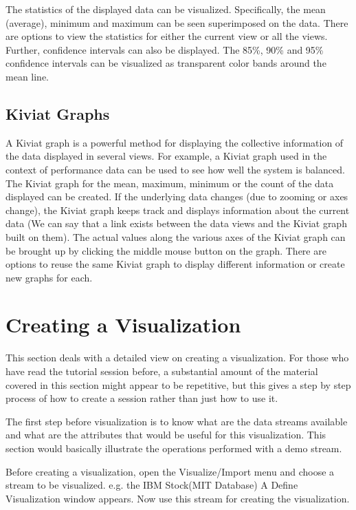 The statistics of the displayed data can be visualized. Specifically,
the mean (average), minimum and maximum can be seen superimposed on
the data.  There are options to view the statistics for either the
current view or all the views.  Further, confidence intervals can also
be displayed.  The 85\%, 90\% and 95\% confidence intervals can be
visualized as transparent color bands around the mean line.

\subsection{Kiviat Graphs}

A Kiviat graph is a powerful method for displaying the collective
information of the data displayed in several views. For example, a
Kiviat graph used in the context of performance data can be used to
see how well the system is balanced. The Kiviat graph for the mean,
maximum, minimum or the count of the data displayed can be created. If
the underlying data changes (due to zooming or axes change), the
Kiviat graph keeps track and displays information about the current
data (We can say that a link exists between the data views and the
Kiviat graph built on them). The actual values along the various axes
of the Kiviat graph can be brought up by clicking the middle mouse
button on the graph. There are options to reuse the same Kiviat graph
to display different information or create new graphs for each.

\section{Creating a Visualization}

This section deals with a detailed view on creating a visualization. For those who have read the tutorial session before, a substantial amount of the  material covered in this section might appear to be repetitive, but this gives a step by step process of how to create a session rather than just how to use it.

The first step before visualization is to know what are the data streams available and what are the attributes that would be useful for this visualization. This section would basically illustrate the operations performed with a demo stream.

Before creating a visualization, open the Visualize/Import menu and choose a stream to be visualized. e.g. the IBM Stock(MIT Database)  A Define Visualization window appears. Now use this stream for creating the visualization.

